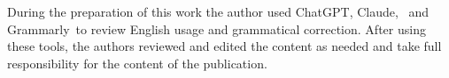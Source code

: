 During the preparation of this work the author used ChatGPT\texttrademark, Claude\texttrademark, ~and Grammarly\texttrademark ~to review English usage and grammatical correction. After using these tools, the authors reviewed and edited the content as needed and take full responsibility for the content of the publication.
